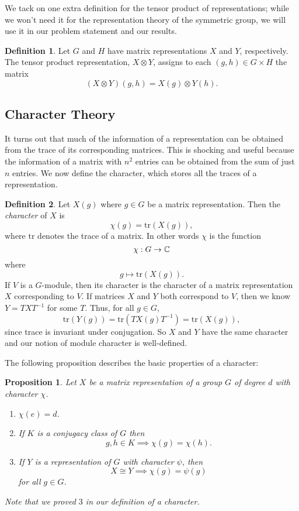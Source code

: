 \documentclass[12pt,twoside]{reedthesis}
\theoremstyle{plain}   %
\newtheorem{prop}{Proposition}[section]
\theoremstyle{definition}
\newtheorem{defn}{Definition}[section]
\theoremstyle{remark}
\numberwithin{equation}{section}
\def\tr{\mathrm{tr}}
\begin{document}
  We tack on one extra definition for the tensor product of representations; while we won't need it for the representation theory of the symmetric group,
  we will use it in our problem statement and our results.
  \begin{defn}
    Let $G$ and $H$ have matrix representations $X$ and $Y$, respectively. The tensor product representation, $X  \otimes Y$, assigns to each $(g, h) \in G \times H$ the matrix
    \[( X \otimes Y) (g,h) = X(g)  \otimes Y(h). \]
  \end{defn}

  \subsection{Character Theory}
  It turns out that much of the information of a representation can be obtained from the trace of its corresponding matrices.
  This is shocking and useful because the information of a matrix with $n^2$ entries can be obtained from the sum of just $n$ entries.
  We now define the character, which stores all the traces of a representation.
  \begin{defn}
    Let $X(g)$ where $g \in G$ be a matrix representation. Then the \emph{character} of $X$ is
    \[ \chi(g) = \tr (X(g)),\]
    where $\tr$ denotes the trace of a matrix. In other words $\chi$ is the function
    \[\chi: G \to \mathbb{C}\]
    where
    \[g \mapsto \tr (X(g)).\]
    If $V$ is a $G$-module, then its character is the character of a matrix representation $X$ corresponding to $V$.
    If matrices $X$ and $Y$ both correspond to $V$, then we know $Y = TXT^{-1}$ for some $T$. Thus, for all $g \in G$,
    \[\tr ( Y(g)) = \tr( TX(g)T^{-1}) = \tr( X(g)),\]
    since trace is invariant under conjugation. So $X$ and $Y$ have the same character and our notion of module character is well-defined.
  \end{defn}
  The following proposition describes the basic properties of a character:
  \begin{prop}
    Let $X$ be a matrix representation of a group $G$ of degree $d$ with character $\chi$.
    \begin{enumerate}
    \item $\chi( e) = d$.
    \item If $K$ is a conjugacy class of $G$ then
      \[ g, h \in K \implies \chi(g) = \chi(h). \]
    \item If $Y$ is a representation of $G$ with character $\psi$, then
      \[ X \cong Y \implies \chi(g) = \psi(g) \]
      for all $g \in G$.
    \end{enumerate}
    Note that we proved $3$ in our definition of a character.
  \end{prop}
    
\end{document}

